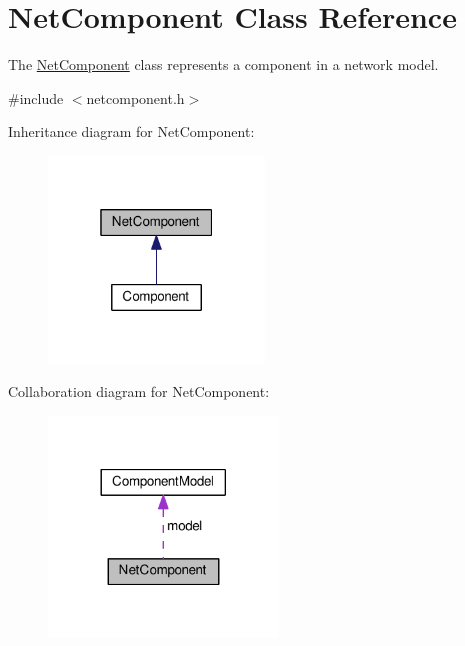 \hypertarget{class_net_component}{}\section{Net\+Component Class Reference}
\label{class_net_component}


The \hyperlink{class_net_component}{Net\+Component} class represents a component in a network model.  




{\ttfamily \#include $<$netcomponent.\+h$>$}



Inheritance diagram for Net\+Component\+:\nopagebreak
\begin{figure}[H]
\begin{center}
\leavevmode
\includegraphics[width=163pt]{class_net_component__inherit__graph}
\end{center}
\end{figure}


Collaboration diagram for Net\+Component\+:\nopagebreak
\begin{figure}[H]
\begin{center}
\leavevmode
\includegraphics[width=173pt]{class_net_component__coll__graph}
\end{center}
\end{figure}

